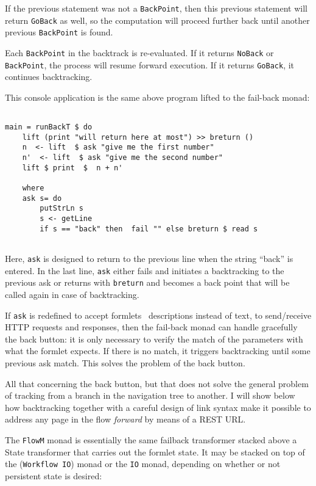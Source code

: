 \documentclass{tmr}
\begin{document}
If the previous statement was not a {\tt BackPoint}, then this  previous statement will return {\tt GoBack} as well, so the computation will proceed further back until another previous {\tt BackPoint} is found. 
 
Each {\tt BackPoint} in the backtrack is re-evaluated. If it returns {\tt NoBack} or {\tt BackPoint}, the process will resume forward execution. If it returns {\tt GoBack}, it continues backtracking. 
 
This console application is the same above program lifted to the fail-back monad: 
 
{\tt 
 
\begin{verbatim} 
 
main = runBackT $ do 
    lift (print "will return here at most") >> breturn () 
    n  <- lift  $ ask "give me the first number" 
    n'  <- lift  $ ask "give me the second number" 
    lift $ print  $  n + n' 
 
    where 
    ask s= do 
        putStrLn s 
        s <- getLine 
        if s == "back" then  fail "" else breturn $ read s 
 
\end{verbatim} 
 
} 
 
Here, {\tt ask} is designed to return to the  previous line  when the string ``back'' is entered. In the last line, {\tt ask} either fails and initiates a backtracking to the previous ask or returns with {\tt breturn} and becomes a back point that will be called again in case of backtracking. 
 
If {\tt ask} is redefined to accept formlets~\cite{auth:formlets} descriptions instead of text, to send/receive HTTP requests and 
responses, then the fail-back monad can handle gracefully the  back button: it is only necessary to verify the match of the parameters with what the formlet expects. If there is no match, it triggers backtracking until some previous ask match. This solves the problem of the back button. 
 
All that concerning the back button, but that does not solve the general problem of tracking from a branch in the navigation tree to another.  I will show below how backtracking together with a careful design of link syntax make it possible to address any page in the flow \textit{forward} by means of a REST URL\@. 
 
The {\tt FlowM} monad is essentially the same failback transformer stacked above a State transformer that carries out the formlet state. It may be stacked on top of the ({\tt Workflow IO}) monad or the {\tt IO} monad, depending on whether or not persistent state is desired: 
 
\end{document}
